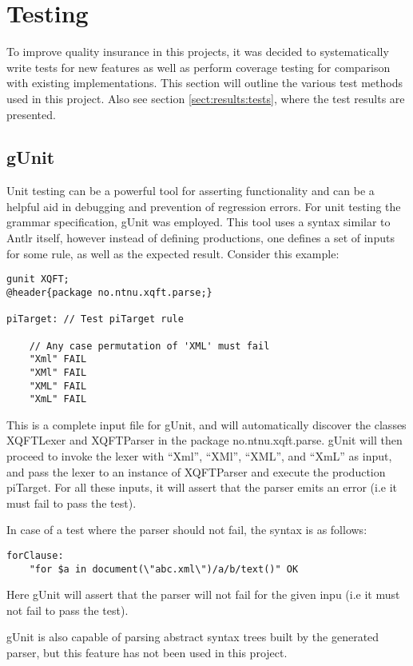 \section{Testing}
To improve quality insurance in this projects, it was decided to systematically
write tests for new features as well as perform coverage testing for comparison
with existing implementations. This section will outline the various test
methods used in this project. Also see section \ref{sect:results:tests}, where
the test results are presented.

\subsection{gUnit}
\label{sect:method:gUnit}
Unit testing can be a powerful tool for asserting functionality and can be a
helpful aid in debugging and prevention of regression errors.  For unit testing the
grammar specification, gUnit \cite{gunit00} was employed. This tool uses a
syntax similar to Antlr itself, however instead of defining productions, one
defines a set of inputs for some rule, as well as the expected result. Consider
this example:

\begin{verbatim}
gunit XQFT;
@header{package no.ntnu.xqft.parse;}

piTarget: // Test piTarget rule

    // Any case permutation of 'XML' must fail
    "Xml" FAIL
    "XMl" FAIL
    "XML" FAIL
    "XmL" FAIL
\end{verbatim}

This is a complete input file for gUnit, and will automatically discover the
classes XQFTLexer and XQFTParser in the package no.ntnu.xqft.parse. gUnit will
then proceed to invoke the lexer with ``Xml'', ``XMl'', ``XML'', and ``XmL'' as
input, and pass the lexer to an instance of XQFTParser and execute the production
piTarget. For all these inputs, it will assert that the parser emits an error
(i.e it must fail to pass the test).

In case of a test where the parser should not fail, the syntax is as follows:
\begin{verbatim}
forClause:
	"for $a in document(\"abc.xml\")/a/b/text()" OK
\end{verbatim}
Here gUnit will assert that the parser will not fail for the given inpu (i.e it
must not fail to pass the test).

gUnit is also capable of parsing abstract syntax trees built by the generated
parser, but this feature has not been used in this project.

